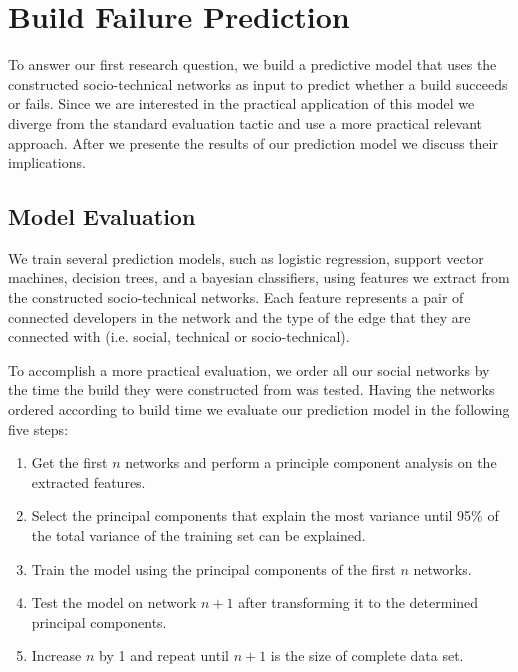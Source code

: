 \section{Build Failure Prediction}
\label{sec:prediction}
To answer our first research question, we build a predictive model that uses the
constructed socio-technical networks as input to predict whether a build succeeds
or fails. Since we are interested in the practical application of this model we
diverge from the standard evaluation tactic and use a more practical relevant
approach. After we presente the results of our prediction model we discuss their
implications.

\subsection{Model Evaluation}
We train several prediction models, such as logistic regression, support vector
machines, decision trees, and a bayesian classifiers, using features we
extract from the constructed socio-technical networks. Each feature represents a pair of
connected developers in the network and the type of the edge that they are
connected with (i.e. social, technical or socio-technical).

To accomplish a more practical evaluation, we order all our social networks by the time the build they were constructed from was tested.
Having the networks ordered according to build time we evaluate our prediction model in the following five steps:%

\begin{enumerate}
\item Get the first $n$ networks and perform a principle component analysis on the extracted features.
\item Select the principal components that explain the most variance until 95\% of the total variance of the training set can be explained.
\item Train the model using the principal components of the first $n$ networks.
\item Test the model on network $n+1$ after transforming it to the determined principal components.
\item Increase $n$ by 1 and repeat until $n+1$ is the size of complete data set.
\end{enumerate}

